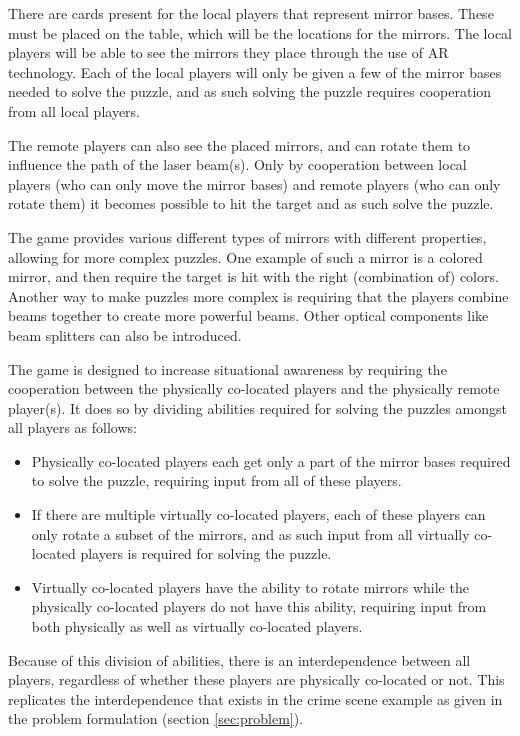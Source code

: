 		There are cards present for the local players that represent mirror 
		bases. These must be placed on the table, which will be the locations 
		for the mirrors. The local players will be able to see the mirrors they 
		place through the use of AR technology. Each of the local players will 
		only be given a few of the mirror bases needed to solve the puzzle, and 
		as such solving the puzzle requires cooperation from all local players.
		
		The remote players can also see the placed mirrors, and can rotate them 
		to influence the path of the laser beam(s). Only by cooperation between 
		local players (who can only move the mirror bases) and remote players 
		(who can only rotate them) it becomes possible to hit the target and as 
		such solve the puzzle.
		
		The game provides various different types of mirrors with different 
		properties, allowing for more complex puzzles. One example of such a 
		mirror is a colored mirror, and then require the target is hit with the 
		right (combination of) colors. Another way to make puzzles more complex 
		is requiring that the players combine beams together to create more 
		powerful beams. Other optical components like beam splitters can also be 
		introduced.
		
		The game is designed to increase situational awareness by requiring the 
		cooperation between the physically co-located players and the physically 
		remote player(s). It does so by dividing abilities required for solving
		the puzzles amongst all players as follows:
		
		\begin{itemize}
			\item Physically co-located players each get only a part of the 
			      mirror bases required to solve the puzzle, requiring input 
			      from all of these players.
			\item If there are multiple virtually co-located players, each of 
			      these players can only rotate a subset of the mirrors, and 
			      as such input from all virtually co-located players is 
			      required for solving the puzzle. 
			\item Virtually co-located players have the ability to rotate 
			      mirrors while the physically co-located players do not have 
			      this ability, requiring input from both physically as well
			      as virtually co-located players.
		\end{itemize}

		Because of this division of abilities, there is an interdependence 
		between all players, regardless of whether these players are physically 
		co-located or not. This replicates the interdependence that exists in 
		the crime scene example as given in the problem formulation (section 
		\ref{sec:problem}).
